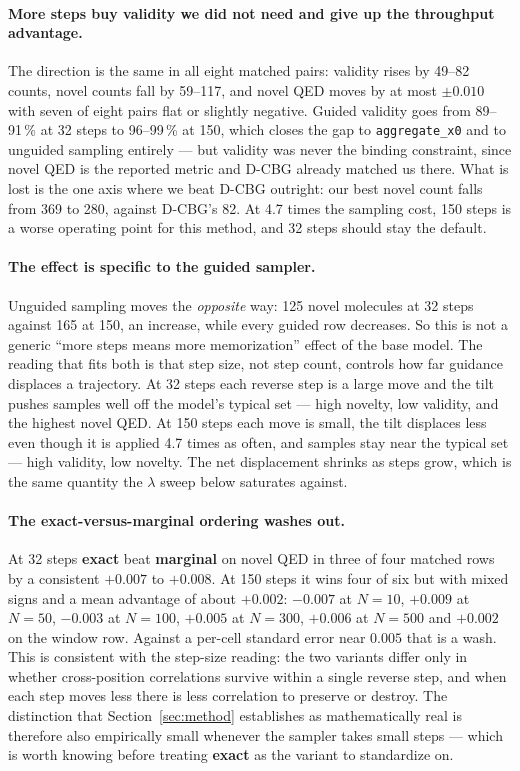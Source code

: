\documentclass[11pt]{article}
\begin{document}
\paragraph{More steps buy validity we did not need and give up the throughput
advantage.}
The direction is the same in all eight matched pairs: validity rises by 49--82
counts, novel counts fall by 59--117, and novel QED moves by at most $\pm 0.010$
with seven of eight pairs flat or slightly negative. Guided validity goes from
89--91\,\% at 32 steps to 96--99\,\% at 150, which closes the gap to
\texttt{aggregate\_x0} and to unguided sampling entirely --- but validity was
never the binding constraint, since novel QED is the reported metric and D-CBG
already matched us there. What is lost is the one axis where we beat D-CBG
outright: our best novel count falls from 369 to 280, against D-CBG's 82. At 4.7
times the sampling cost, 150 steps is a worse operating point for this method,
and 32 steps should stay the default.

\paragraph{The effect is specific to the guided sampler.}
Unguided sampling moves the \emph{opposite} way: 125 novel molecules at 32 steps
against 165 at 150, an increase, while every guided row decreases. So this is not
a generic ``more steps means more memorization'' effect of the base model. The
reading that fits both is that step size, not step count, controls how far
guidance displaces a trajectory. At 32 steps each reverse step is a large move
and the tilt pushes samples well off the model's typical set --- high novelty,
low validity, and the highest novel QED. At 150 steps each move is small, the
tilt displaces less even though it is applied 4.7 times as often, and samples
stay near the typical set --- high validity, low novelty. The net displacement
shrinks as steps grow, which is the same quantity the $\lambda$ sweep below
saturates against.

\paragraph{The exact-versus-marginal ordering washes out.}
At 32 steps \textbf{exact} beat \textbf{marginal} on novel QED in three of four
matched rows by a consistent $+0.007$ to $+0.008$. At 150 steps it wins four of
six but with mixed signs and a mean advantage of about $+0.002$: $-0.007$ at
$N{=}10$, $+0.009$ at $N{=}50$, $-0.003$ at $N{=}100$, $+0.005$ at $N{=}300$,
$+0.006$ at $N{=}500$ and $+0.002$ on the window row. Against a per-cell standard
error near $0.005$ that is a wash. This is consistent with the step-size reading:
the two variants differ only in whether cross-position correlations survive
within a single reverse step, and when each step moves less there is less
correlation to preserve or destroy. The distinction that Section~\ref{sec:method}
establishes as mathematically real is therefore also empirically small whenever
the sampler takes small steps --- which is worth knowing before treating
\textbf{exact} as the variant to standardize on.
\end{document}
